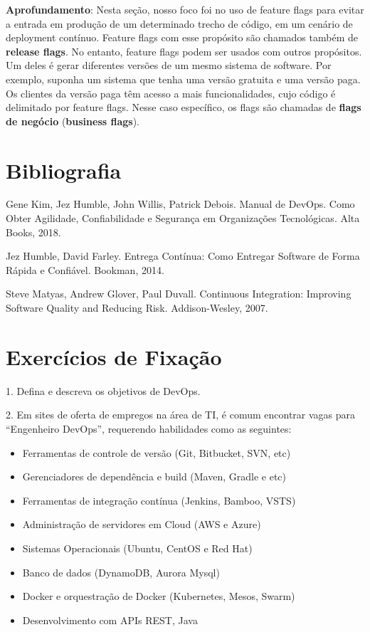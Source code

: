 \documentclass[
  11pt,
  twoside]{book}
\providecommand{\tightlist}{%
  \setlength{\itemsep}{0pt}\setlength{\parskip}{0pt}}
\newenvironment{esmbox}{\centering \vspace{1.5ex} \begin{tcolorbox}[breakable, colback=backcolor, width=4.9in]}{\end{tcolorbox} \vspace{1.5ex}}
\begin{document}
\begin{esmbox}

\textbf{Aprofundamento}: Nesta seção, nosso foco foi no uso de feature
flags para evitar a entrada em produção de um determinado trecho de
código, em um cenário de deployment contínuo. Feature flags com esse
propósito são chamados também de \textbf{release flags}. No entanto,
feature flags podem ser usados com outros propósitos. Um deles é gerar
diferentes versões de um mesmo sistema de software. Por exemplo, suponha
um sistema que tenha uma versão gratuita e uma versão paga. Os clientes
da versão paga têm acesso a mais funcionalidades, cujo código é
delimitado por feature flags. Nesse caso específico, os flags são
chamadas de \textbf{flags de negócio} (\textbf{business flags}).

\end{esmbox}

\hypertarget{bibliografia-9}{%
\section*{Bibliografia}\label{bibliografia-9}}

Gene Kim, Jez Humble, John Willis, Patrick Debois. Manual de DevOps.
Como Obter Agilidade, Confiabilidade e Segurança em Organizações
Tecnológicas. Alta Books, 2018.

Jez Humble, David Farley. Entrega Contínua: Como Entregar Software de
Forma Rápida e Confiável. Bookman, 2014.

Steve Matyas, Andrew Glover, Paul Duvall. Continuous Integration:
Improving Software Quality and Reducing Risk. Addison-Wesley, 2007.

\hypertarget{exercuxedcios-de-fixauxe7uxe3o-9}{%
\section*{Exercícios de
Fixação}\label{exercuxedcios-de-fixauxe7uxe3o-9}}

1. Defina e descreva os objetivos de DevOps.

2. Em sites de oferta de empregos na área de TI, é comum encontrar vagas
para ``Engenheiro DevOps'', requerendo habilidades como as seguintes:

\begin{itemize}
\tightlist
\item
  Ferramentas de controle de versão (Git, Bitbucket, SVN, etc)
\item
  Gerenciadores de dependência e build (Maven, Gradle e etc)
\item
  Ferramentas de integração contínua (Jenkins, Bamboo, VSTS)
\item
  Administração de servidores em Cloud (AWS e Azure)
\item
  Sistemas Operacionais (Ubuntu, CentOS e Red Hat)
\item
  Banco de dados (DynamoDB, Aurora Mysql)
\item
  Docker e orquestração de Docker (Kubernetes, Mesos, Swarm)
\item
  Desenvolvimento com APIs REST, Java
\end{itemize}
\end{document}
